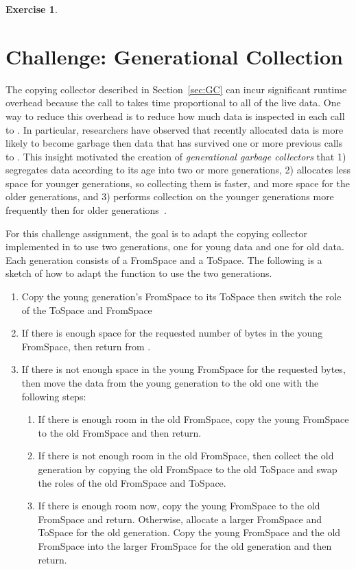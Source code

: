\documentclass[7x10]{TimesAPriori_MIT}%
\newtheorem{exercise}[theorem]{Exercise}
\begin{document}
{\begin{exercise}
\end{exercise}

\section{Challenge: Generational Collection}

The copying collector described in Section~\ref{sec:GC} can incur
significant runtime overhead because the call to  takes
time proportional to all of the live data. One way to reduce this
overhead is to reduce how much data is inspected in each call to
. In particular, researchers have observed that recently
allocated data is more likely to become garbage then data that has
survived one or more previous calls to . This insight
motivated the creation of \emph{generational garbage collectors}
 that
1) segregates data according to its age into two or more generations,
2) allocates less space for younger generations, so collecting them is
faster, and more space for the older generations, and 3) performs
collection on the younger generations more frequently then for older
generations~\citep{Wilson:1992fk}.

For this challenge assignment, the goal is to adapt the copying
collector implemented in  to use two generations, one
for young data and one for old data. Each generation consists of a
FromSpace and a ToSpace. The following is a sketch of how to adapt the
 function to use the two generations.

\begin{enumerate}
\item Copy the young generation's FromSpace to its ToSpace then switch
  the role of the ToSpace and FromSpace
\item If there is enough space for the requested number of bytes in
  the young FromSpace, then return from .
\item If there is not enough space in the young FromSpace for the
  requested bytes, then move the data from the young generation to the
  old one with the following steps:
  \begin{enumerate}
  \item If there is enough room in the old FromSpace, copy the young
    FromSpace to the old FromSpace and then return.
  \item If there is not enough room in the old FromSpace, then collect
    the old generation by copying the old FromSpace to the old ToSpace
    and swap the roles of the old FromSpace and ToSpace.
  \item If there is enough room now, copy the young FromSpace to the
    old FromSpace and return. Otherwise, allocate a larger FromSpace
    and ToSpace for the old generation.  Copy the young FromSpace and
    the old FromSpace into the larger FromSpace for the old
    generation and then return.
  \end{enumerate}
\end{enumerate}

}
\end{document}
